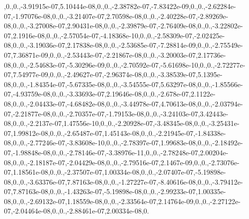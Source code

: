 \begin{DoxyCompactItemize}
,0.,0.,-\/3.\-91915e-\/07,5.\-10444e-\/08,0.,0.,-\/2.\-38782e-\/07,-\/7.\-83422e-\/09,0.,0.,-\/2.\-62284e-\/07,-\/1.\-97076e-\/08,0.,0.,-\/3.\-21407e-\/07,2.\-70598e-\/08,0.,0.,-\/2.\-40228e-\/07,-\/2.\-89269e-\/08,0.,0.,-\/3.\-27008e-\/07,2.\-90431e-\/08,0.,0.,-\/2.\-39879e-\/07,-\/2.\-76409e-\/08,0.,0.,-\/3.\-22802e-\/07,2.\-1916e-\/08,0.,0.,-\/2.\-57054e-\/07,-\/4.\-18368e-\/10,0.,0.,-\/2.\-58309e-\/07,-\/2.\-02425e-\/08,0.,0.,-\/3.\-19036e-\/07,2.\-17838e-\/08,0.,0.,-\/2.\-53685e-\/07,-\/7.\-28814e-\/09,0.,0.,-\/2.\-75549e-\/07,7.\-36871e-\/09,0.,0.,-\/2.\-53443e-\/07,-\/2.\-21867e-\/08,0.,0.,-\/3.\-20003e-\/07,2.\-17736e-\/08,0.,0.,-\/2.\-54683e-\/07,-\/5.\-30296e-\/09,0.,0.,-\/2.\-70592e-\/07,-\/5.\-61698e-\/10,0.,0.,-\/2.\-72277e-\/07,7.\-54977e-\/09,0.,0.,-\/2.\-49627e-\/07,-\/2.\-96374e-\/08,0.,0.,-\/3.\-38539e-\/07,5.\-1395e-\/08,0.,0.,-\/1.\-84354e-\/07,-\/5.\-67335e-\/08,0.,0.,-\/3.\-54555e-\/07,5.\-63297e-\/08,0.,0.,-\/1.\-85566e-\/07,-\/4.\-93759e-\/08,0.,0.,-\/3.\-33693e-\/07,2.\-19646e-\/08,0.,0.,-\/2.\-678e-\/07,2.\-1122e-\/08,0.,0.,-\/2.\-04433e-\/07,-\/4.\-68482e-\/08,0.,0.,-\/3.\-44978e-\/07,4.\-70613e-\/08,0.,0.,-\/2.\-03794e-\/07,-\/2.\-21877e-\/08,0.,0.,-\/2.\-70357e-\/07,-\/1.\-79153e-\/08,0.,0.,-\/3.\-24103e-\/07,3.\-42443e-\/08,0.,0.,-\/2.\-2137e-\/07,1.\-47556e-\/10,0.,0.,-\/2.\-20928e-\/07,-\/3.\-48345e-\/08,0.,0.,-\/3.\-25431e-\/07,1.\-99812e-\/08,0.,0.,-\/2.\-65487e-\/07,1.\-45143e-\/08,0.,0.,-\/2.\-21945e-\/07,-\/1.\-84338e-\/08,0.,0.,-\/2.\-77246e-\/07,-\/3.\-83608e-\/10,0.,0.,-\/2.\-78397e-\/07,1.\-99683e-\/08,0.,0.,-\/2.\-18492e-\/07,-\/1.\-98848e-\/08,0.,0.,-\/2.\-78146e-\/07,-\/3.\-38976e-\/11,0.,0.,-\/2.\-78248e-\/07,2.\-00204e-\/08,0.,0.,-\/2.\-18187e-\/07,-\/2.\-04429e-\/08,0.,0.,-\/2.\-79516e-\/07,2.\-1467e-\/09,0.,0.,-\/2.\-73076e-\/07,1.\-18561e-\/08,0.,0.,-\/2.\-37507e-\/07,1.\-00334e-\/08,0.,0.,-\/2.\-07407e-\/07,-\/5.\-19898e-\/08,0.,0.,-\/3.\-63376e-\/07,7.\-87163e-\/08,0.,0.,-\/1.\-27227e-\/07,-\/8.\-40616e-\/08,0.,0.,-\/3.\-79412e-\/07,7.\-87163e-\/08,0.,0.,-\/1.\-43263e-\/07,-\/5.\-19898e-\/08,0.,0.,-\/2.\-99233e-\/07,1.\-00335e-\/08,0.,0.,-\/2.\-69132e-\/07,1.\-18559e-\/08,0.,0.,-\/2.\-33564e-\/07,2.\-14764e-\/09,0.,0.,-\/2.\-27122e-\/07,-\/2.\-04464e-\/08,0.,0.,-\/2.\-88461e-\/07,2.\-00334e-\/08,0.\
\end{DoxyCompactItemize}
